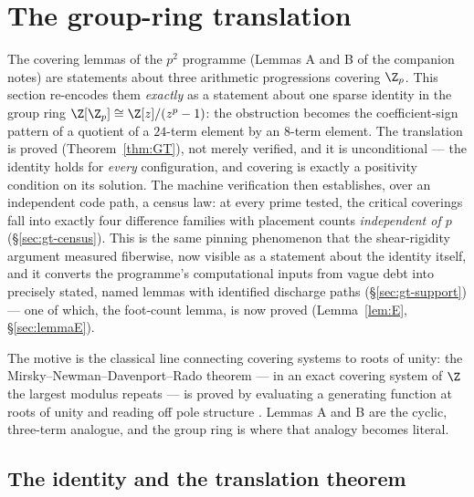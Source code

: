 
\section{The group-ring translation}\label{sec:groupring}

The covering lemmas of the $p^2$ programme (Lemmas A and B of the companion
notes) are statements about three arithmetic progressions covering $\Z_p$.
This section re-encodes them \emph{exactly} as a statement about one sparse
identity in the group ring $\Z[\Z_p]\cong\Z[z]/(z^p-1)$: the obstruction
becomes the coefficient-sign pattern of a quotient of a $24$-term element by
an $8$-term element. The translation is proved (Theorem~\ref{thm:GT}), not
merely verified, and it is unconditional --- the identity holds for
\emph{every} configuration, and covering is exactly a positivity condition on
its solution. The machine verification then establishes, over an independent
code path, a census law: at every prime tested, the critical coverings fall
into exactly four difference families with placement counts \emph{independent
of $p$} (\S\ref{sec:gt-census}). This is the same pinning phenomenon that the
shear-rigidity argument measured fiberwise, now visible as a statement about
the identity itself, and it converts the programme's computational inputs
from vague debt into precisely stated, named lemmas with identified
discharge paths (\S\ref{sec:gt-support}) --- one of which, the foot-count
lemma, is now proved (Lemma~\ref{lem:E}, \S\ref{sec:lemmaE}).

The motive is the classical line connecting covering systems to roots of
unity: the Mirsky--Newman--Davenport--Rado theorem --- in an exact covering
system of $\Z$ the largest modulus repeats --- is proved by evaluating a
generating function at roots of unity and reading off pole structure
\cite{MirskyNewman}. Lemmas A and B are the cyclic, three-term analogue, and
the group ring is where that analogy becomes literal.

\subsection{The identity and the translation theorem}\label{sec:gt-identity}

